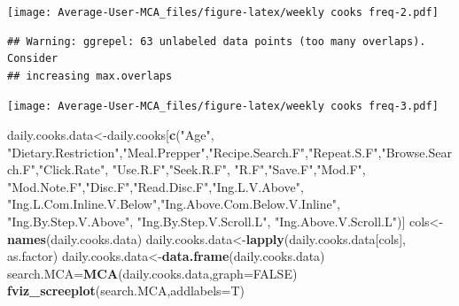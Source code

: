 \documentclass[
]{article}
\newenvironment{Shaded}{\begin{snugshade}}{\end{snugshade}}
\newcommand{\DataTypeTok}[1]{\textcolor[rgb]{0.13,0.29,0.53}{#1}}
\newcommand{\KeywordTok}[1]{\textcolor[rgb]{0.13,0.29,0.53}{\textbf{#1}}}
\newcommand{\NormalTok}[1]{#1}
\newcommand{\OtherTok}[1]{\textcolor[rgb]{0.56,0.35,0.01}{#1}}
\newcommand{\StringTok}[1]{\textcolor[rgb]{0.31,0.60,0.02}{#1}}
\begin{document}
\texttt{[image: Average-User-MCA\_files/figure-latex/weekly cooks freq-2.pdf]}

\begin{Shaded}
\end{Shaded}

\begin{verbatim}
## Warning: ggrepel: 63 unlabeled data points (too many overlaps). Consider
## increasing max.overlaps
\end{verbatim}

\texttt{[image: Average-User-MCA\_files/figure-latex/weekly cooks freq-3.pdf]}

\begin{Shaded}
\begin{Highlighting}[]
\NormalTok{daily.cooks.data<-daily.cooks[}\KeywordTok{c}\NormalTok{(}\StringTok{"Age"}\NormalTok{, }\StringTok{"Dietary.Restriction"}\NormalTok{,}\StringTok{"Meal.Prepper"}\NormalTok{,}\StringTok{"Recipe.Search.F"}\NormalTok{,}\StringTok{"Repeat.S.F"}\NormalTok{,}\StringTok{"Browse.Search.F"}\NormalTok{,}\StringTok{"Click.Rate"}\NormalTok{,}
            \StringTok{"Use.R.F"}\NormalTok{,}\StringTok{"Seek.R.F"}\NormalTok{, }\StringTok{"R.F"}\NormalTok{,}\StringTok{"Save.F"}\NormalTok{,}\StringTok{"Mod.F"}\NormalTok{, }\StringTok{"Mod.Note.F"}\NormalTok{,}\StringTok{"Disc.F"}\NormalTok{,}\StringTok{"Read.Disc.F"}\NormalTok{,}\StringTok{"Ing.L.V.Above"}\NormalTok{,}
            \StringTok{"Ing.L.Com.Inline.V.Below"}\NormalTok{,}\StringTok{"Ing.Above.Com.Below.V.Inline"}\NormalTok{,  }\StringTok{"Ing.By.Step.V.Above"}\NormalTok{,  }\StringTok{"Ing.By.Step.V.Scroll.L"}\NormalTok{,}
            \StringTok{"Ing.Above.V.Scroll.L"}\NormalTok{)]}
\NormalTok{cols<-}\KeywordTok{names}\NormalTok{(daily.cooks.data)}
\NormalTok{daily.cooks.data<-}\KeywordTok{lapply}\NormalTok{(daily.cooks.data[cols], as.factor)}
\NormalTok{daily.cooks.data<-}\KeywordTok{data.frame}\NormalTok{(daily.cooks.data)}
\NormalTok{search.MCA=}\KeywordTok{MCA}\NormalTok{(daily.cooks.data,}\DataTypeTok{graph=}\OtherTok{FALSE}\NormalTok{)}
\KeywordTok{fviz_screeplot}\NormalTok{(search.MCA,}\DataTypeTok{addlabels=}\NormalTok{T)}
\end{Highlighting}
\end{Shaded}
\end{document}
